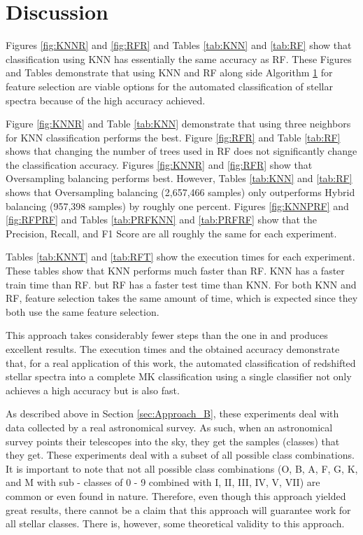 \documentclass[./AutomatedMK.tex]{subfiles}
\begin{document}
\section{Discussion}\label{sec:discussion2}

	Figures \ref{fig:KNNR}  and \ref{fig:RFR} and Tables \ref{tab:KNN} and \ref{tab:RF} show that classification using KNN has essentially the same accuracy as RF. These Figures and Tables demonstrate that using KNN and RF along side Algorithm \hyperlink{alg:FS}{1} for feature selection are viable options for the automated classification of stellar spectra because of the high accuracy achieved.

Figure \ref{fig:KNNR} and Table \ref{tab:KNN} demonstrate that using three neighbors for KNN classification performs the best. Figure \ref{fig:RFR} and Table \ref{tab:RF} shows that changing the number of trees used in RF does not significantly change the classification accuracy. Figures \ref{fig:KNNR}  and \ref{fig:RFR} show that Oversampling balancing performs best. However, Tables \ref{tab:KNN} and \ref{tab:RF} shows that Oversampling balancing (2,657,466 samples) only outperforms Hybrid balancing (957,398 samples) by roughly one percent. Figures \ref{fig:KNNPRF} and \ref{fig:RFPRF} and Tables \ref{tab:PRFKNN} and \ref{tab:PRFRF} show that the Precision, Recall, and F1 Score are all roughly the same for each experiment. 

Tables \ref{tab:KNNT} and \ref{tab:RFT} show the execution times for each experiment. These tables show that KNN performs much faster than RF. KNN has a faster train time than RF. but RF has a faster test time than KNN. For both KNN and RF, feature selection takes the same amount of time, which is expected since they both use the same feature selection.
	
This approach takes considerably fewer steps than the one in \citeauthor{Bolton} and produces excellent results. The execution times and the obtained accuracy demonstrate that, for a real application of this work, the automated classification of redshifted stellar spectra into a complete MK classification using a single classifier not only achieves a high accuracy but is also fast.

As described above in Section \ref{sec:Approach_B}, these experiments deal with data collected by a real astronomical survey. As such, when an astronomical survey points their telescopes into the sky, they get the samples (classes) that they get. These experiments deal with a subset of all possible class combinations. It is important to note that not all possible class combinations (O, B, A, F, G, K, and M with sub - classes of 0 - 9 combined with I, II, III, IV, V, VII) are common or even found in nature. Therefore, even though this approach yielded great results, there cannot be a claim that this approach will guarantee work for all stellar classes. There is, however, some theoretical validity to this approach. 
\end{document}
